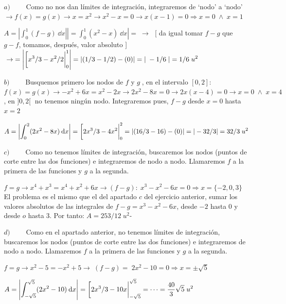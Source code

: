\begin{proofw}\renewcommand{\qedsymbol}{$\diamond$}


\hspace{5mm} $a) \qquad $ Como no nos dan límites de integración, integraremos de `nodo' a `nodo' $\to f(x)=g(x)\to x=x^2\to x^2-x=0 \to x(x-1)=0 \Rightarrow x=0\; \wedge \; x=1$

$A=\displaystyle \left| \int_{0}^{1} (f-g) \: \dd x \right|\left| = \int_{0}^{1} (x^2-x) \: \dd x \right|= \; \to \;$ 
[\footnotesize{ da igual tomar $f-g$ que $g-f$, tomamos, después, valor absoluto } \normalsize{]}
$\displaystyle \; \to\; = \left| \eval[x^3/3-x^2/2|_0^1 \right|= |(1/3-1/2)-(0)|=|\; -1/6 \;|= 1/6 \; u^2$



\vspace{2mm}$b) \qquad$ Busquemos primero los nodos de $f$ y $g\;$, en el intervalo $[0,2]$: $f(x)=g(x) \to -x^2+6x=x^2-2x \to 2x^2-8x=0 \to 2x(x-4)=0 \rightarrow x=0 \; \wedge \; x=4\; $, en  $]0,2[\; $ no tenemos ningún nodo. Integraremos pues, $f-g$ desde $x=0$ hasta $x=2$

$A=\displaystyle \left| \int_{0}^{2} (2x^2-8x) \: \dd x \right| = \eval[2x^3/3-4x^2|_0^2 = \left| (16/3-16)-(0) \right|=|-32/3|=32/3 \; u^2 $

\vspace{2mm}$c) \qquad$ Como no tenemos límites de integración, buscaremos los nodos (puntos de corte entre las dos funciones) e integraremos de nodo a nodo. Llamaremos $f$ a la primera de las funciones y $g$ a la segunda.

$f=g\to x^4+x^3=x^4+x^2+6x \to (f-g):\; x^3-x^2-6x=0 \Rightarrow  x=\{-2, 0, 3\}$
El problema es el mismo que el del apartado $c$ del ejercicio anterior, sumar los valores absolutos de las integrales de $f-g=x^3-x^2-6x$, desde $-2$ hasta $0$ y desde $o$ hasta $3$. Por tanto: $A=253/12\; u^2$-

\vspace{2mm}$d) \qquad$ Como en el apartado anterior, no tenemos límites de integración, buscaremos los nodos (puntos de corte entre las dos funciones) e integraremos de nodo a nodo. Llamaremos $f$ a la primera de las funciones y $g$ a la segunda.



$f=g\to x^2-5=-x^2+5 \to \; (f-g)=\; 2x^2-10=0 \Rightarrow x=\pm \sqrt{5}$

$A=\displaystyle \left| \int_{-\sqrt{5}}^{\sqrt{5}} (2x^2-10) \: \dd x \right|= \eval[2x^3/3-10x|_{-\sqrt{5}}^{\sqrt{5}}=\cdots=\frac {40}{3}\sqrt{5}\; u^2$


\end{proofw}
